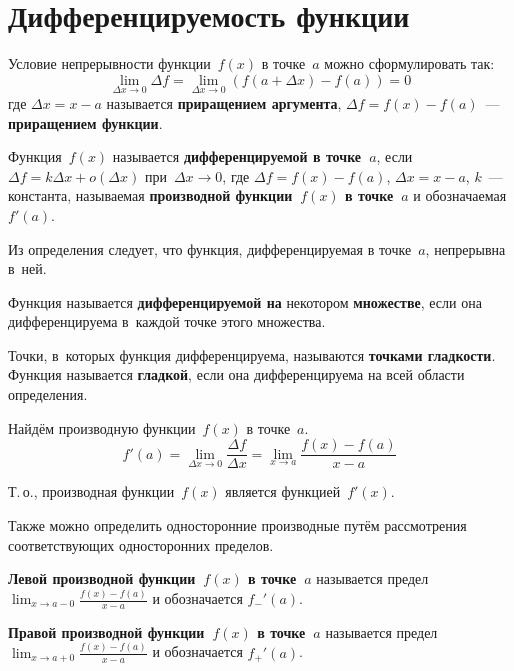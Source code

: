 \section{Дифференцируемость функции}
Условие непрерывности функции~$f(x)$ в точке~$a$ можно сформулировать так:
\begin{equation*}
\lim_{\Delta x \to 0} \Delta f = \lim_{\Delta x \to 0} (f(a + \Delta x) - f(a)) = 0
\end{equation*}
где $\Delta x = x - a$ называется \textbf{приращением аргумента}, $\Delta f = f(x) - f(a)$~--- \textbf{приращением функции}.

 Функция~$f(x)$ называется \textbf{дифференцируемой в точке~$a$}, если
$\Delta f = k \Delta x + o(\Delta x)$ при~$\Delta x \to 0$, где
$\Delta f = f(x) - f(a)$,
$\Delta x = x - a$,
$k$~--- константа, называемая \textbf{производной функции~$f(x)$ в точке~$a$} и обозначаемая $f'(a)$.

Из определения следует, что функция, дифференцируемая в точке~$a$, непрерывна в~ней.

Функция называется \textbf{дифференцируемой на} некотором \textbf{множестве}, если она дифференцируема в~каждой точке этого множества.

 Точки, в~которых функция дифференцируема, называются \textbf{точками гладкости}.
Функция называется \textbf{гладкой}, если она дифференцируема на всей области определения.

Найдём производную функции~$f(x)$ в точке~$a$.
\begin{equation*}
f'(a) = \lim_{\Delta x \to 0} \frac{\Delta f}{\Delta x} = \lim_{x \to a} \frac{f(x) - f(a)}{x - a}
\end{equation*}

Т.\,о., производная функции~$f(x)$ является функцией~$f'(x)$.

Также можно определить односторонние производные путём рассмотрения соответствующих односторонних пределов.

\textbf{Левой производной функции~$f(x)$ в точке~$a$} называется предел~$\displaystyle \lim_{x \to a-0} \frac{f(x) - f(a)}{x - a}$ и обозначается $f_-'(a)$.

\textbf{Правой производной функции~$f(x)$ в точке~$a$} называется предел~$\displaystyle \lim_{x \to a+0} \frac{f(x) - f(a)}{x - a}$ и обозначается $f_+'(a)$.